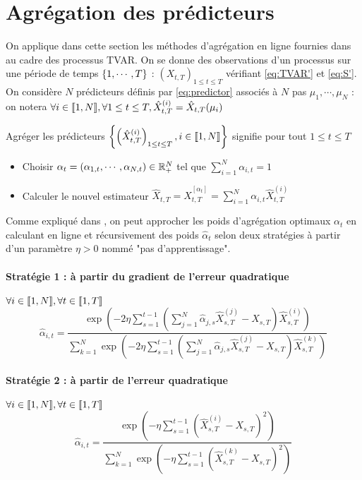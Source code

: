 \documentclass{report}
\begin{document}
\section{Agrégation des prédicteurs}
On applique dans cette section les méthodes d'agrégation en ligne fournies dans \citep{giraud-roueff-sanchez-aos2015} au cadre des processus TVAR. On se donne des observations d'un processus sur une période de temps ${ \left\lbrace 1,\cdots,T \right\rbrace }$ :  $(X_{t,T})_{1 \leq t \leq T}$ vérifiant \eqref{eq:TVAR'} et \eqref{eq:S'}. On considère $N$ prédicteurs définis par \eqref{eq:predictor} associés à $N$ pas $\mu_1, \cdots, \mu_N$ : on notera $\forall i \in { \left\llbracket 1,N \right\rrbracket}, \forall 1\leq t \leq T, \hat{X}_{t,T}^{(i)} = \hat{X}_{t,T}(\mu_i)$
\begin{Def}[Agrégation]
Agréger les prédicteurs ${ \left\lbrace \left(\hat{X}_{t,T}^{(i)}\right)_{1\leq t\leq T}, i\in { \left\llbracket 1,N \right\rrbracket} \right\rbrace }$ signifie pour tout $1\leq t \leq T$
\begin{itemize}
\item Choisir $\alpha_t=(\alpha_{1,t},\cdots,\alpha_{N,t}) \in \mathbb{R}_+^N$ tel que $\sum_{i=1}^N \alpha_{i,t} = 1$ 
\item Calculer le nouvel estimateur $\hat{X}_{t,T} = \hat{X}_{t,T}^{[\alpha_t]} = \sum_{i=1}^N \alpha_{i,t} \hat{X}_{t,T}^{(i)}$
\end{itemize}
\end{Def}
Comme expliqué dans \citep{giraud-roueff-sanchez-aos2015}, on peut approcher les poids d'agrégation optimaux $\alpha_t$ en calculant en ligne et récursivement des poids $\hat{\alpha}_t$ selon deux stratégies à partir d'un paramètre $\eta >0$ nommé "pas d'apprentissage".
\paragraph{Stratégie 1 : à partir du gradient de l'erreur quadratique}
$\forall i \in { \left\llbracket 1,N \right\rrbracket}, \forall t\in { \left\llbracket 1,T \right\rrbracket}$
$$
\hat{\alpha}_{i,t} = \frac{\exp\left( -2\eta \sum_{s=1}^{t-1} \left( \sum_{j=1}^N \hat{\alpha}_{j,s} \hat{X}_{s,T}^{(j)}-X_{s,T} \right)\hat{X}_{s,T}^{(i)}\right)}{\sum_{k=1}^N \exp\left( -2\eta \sum_{s=1}^{t-1} \left( \sum_{j=1}^N \hat{\alpha}_{j,s} \hat{X}_{s,T}^{(j)}-X_{s,T} \right)\hat{X}_{s,T}^{(k)}\right)}
$$
\paragraph{Stratégie 2 : à partir de l'erreur quadratique}
$\forall i \in { \left\llbracket 1,N \right\rrbracket}, \forall t\in { \left\llbracket 1,T \right\rrbracket}$
$$
\hat{\alpha}_{i,t} = \frac{\exp\left( -\eta \sum_{s=1}^{t-1} \left( \hat{X}_{s,T}^{(i)} - X_{s,T}\right)^2\right)}{\sum_{k=1}^N \exp\left( -\eta \sum_{s=1}^{t-1} \left( \hat{X}_{s,T}^{(k)} - X_{s,T}\right)^2\right)}
$$
\end{document}
